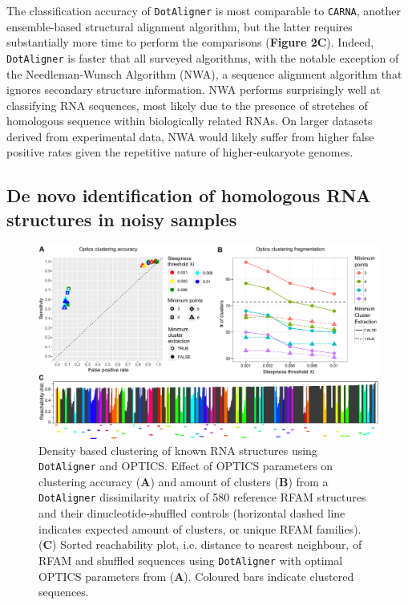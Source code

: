 \documentclass[a4paper,11pt]{article}
\newcommand\dotaligner{\texttt{DotAligner}}
\newcommand\carna{\texttt{CARNA}}
\begin{document}
The classification accuracy  of \dotaligner{} is most comparable 
to \carna{}, another ensemble-based structural alignment algorithm, but the latter
requires substantially more time to perform the comparisons (\textbf{Figure 2C}). 
Indeed, \dotaligner{} is faster that all surveyed algorithms, with the notable 
exception of the Needleman-Wunsch Algorithm (NWA), a sequence alignment 
algorithm that ignores secondary structure information. NWA performs 
surprisingly well at classifying RNA sequences, most likely due to the presence
of stretches of homologous sequence within biologically related RNAs. On 
larger datasets derived from experimental data, NWA would likely suffer from 
higher false positive rates given the repetitive nature of higher-eukaryote genomes.

\subsection*{ De novo identification of homologous RNA structures in noisy samples }

  \begin{figure}
 \includegraphics[width=\textwidth]{fig3}
 \caption { Density based clustering of known RNA structures using \dotaligner{} and OPTICS. Effect of OPTICS parameters on clustering accuracy (\textbf{A}) and amount of clusters (\textbf{B}) from a \dotaligner{} dissimilarity matrix of 580 reference RFAM structures and their dinucleotide-shuffled controls (horizontal dashed line indicates expected amount of clusters, or unique RFAM families). (\textbf{C}) Sorted reachability plot, i.e. distance to nearest neighbour, of RFAM and shuffled sequences using \dotaligner{} with optimal OPTICS parameters from (\textbf{A}). Coloured bars indicate clustered sequences. 
 }
\end{figure}
\end{document}
